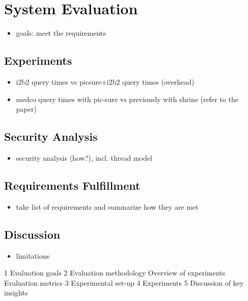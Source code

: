 \chapter{System Evaluation}

\begin{itemize}
    \item goals: meet the requirements
\end{itemize}

\section{Experiments}


\begin{itemize}
    \item i2b2 query times vs picsure+i2b2 query times (overhead)
    \item medco query times with pic-sure vs previously with shrine (refer to the paper)
\end{itemize}

\section{Security Analysis}
\begin{itemize}
    \item security analysis (how?), incl. thread model
\end{itemize}





\section{Requirements Fulfillment}
\begin{itemize}
    \item take list of requirements and summarize how they are met
\end{itemize}

\section{Discussion}
\begin{itemize}
    \item limitations
\end{itemize}


1 Evaluation goals
2 Evaluation methodology
Overview of experiments
Evaluation metrics
3 Experimental set-up
4 Experiments
5 Discussion of key insights